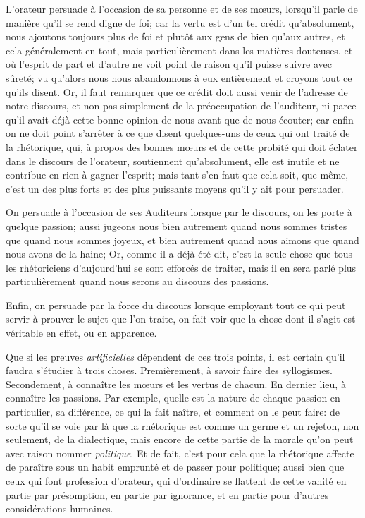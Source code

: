 \bigbreak

L'orateur persuade à l'occasion de sa personne et de ses mœurs, lorsqu'il parle de manière qu'il se rend digne de foi; car la vertu est d'un tel crédit
qu'absolument, nous ajoutons toujours plus de foi et plutôt aux gens de bien qu'aux autres, et cela généralement en tout, mais particulièrement dans les
matières douteuses, et où l'esprit de part et d'autre ne voit point de raison qu'il puisse suivre avec sûreté; vu qu'alors nous nous abandonnons à eux
entièrement et croyons tout ce qu'ils disent. Or, il faut remarquer que ce crédit doit aussi venir de l'adresse de notre discours, et non pas simplement
de la préoccupation de l'auditeur, ni parce qu'il avait déjà cette bonne opinion de nous avant que de nous écouter; car enfin on ne doit point s'arrêter
à ce que disent quelques-uns de ceux qui ont traité de la rhétorique, qui, à propos des bonnes mœurs et de cette probité qui doit éclater dans le discours
de l'orateur, soutiennent qu'absolument, elle est inutile et ne contribue en rien à gagner l'esprit; mais tant s'en faut que cela soit, que même, c'est un
des plus forts et des plus puissants moyens qu'il y ait pour persuader.

On persuade à l'occasion de ses Auditeurs  lorsque par le discours, on les porte à quelque passion; aussi jugeons nous bien autrement quand nous sommes
tristes que quand nous sommes joyeux, et bien autrement quand nous aimons que quand nous avons de la haine; Or, comme il a déjà été dit, c'est la seule
chose que tous les rhétoriciens d'aujourd'hui se sont efforcés de traiter, mais il en sera parlé plus particulièrement quand nous serons au discours des
passions. 

Enfin, on persuade par la force du discours lorsque employant tout ce qui peut servir à prouver le sujet que l'on traite, on fait voir que la chose dont
il s'agit est véritable en effet, ou en apparence.

\bigbreak

Que si les preuves \emph{artificielles} dépendent de ces trois points, il est certain qu'il faudra s'étudier à trois choses. Premièrement, à savoir faire
des syllogismes. Secondement, à connaître les mœurs et les vertus de chacun. En dernier lieu, à connaître les passions. Par exemple, quelle est la nature
de chaque passion en particulier, sa différence, ce qui la fait naître, et comment on le peut faire: de sorte qu'il se voie  par là que la rhétorique est
comme un germe et un rejeton, non seulement, de la dialectique, mais encore de cette partie de la morale qu'on peut avec raison nommer \emph{politique}. Et
de fait, c'est pour cela que la rhétorique affecte de paraître sous un habit emprunté et de passer pour politique; aussi bien que ceux qui font profession
d'orateur, qui d'ordinaire se flattent de cette vanité en partie par présomption, en partie par ignorance, et en partie pour d'autres considérations
humaines.

